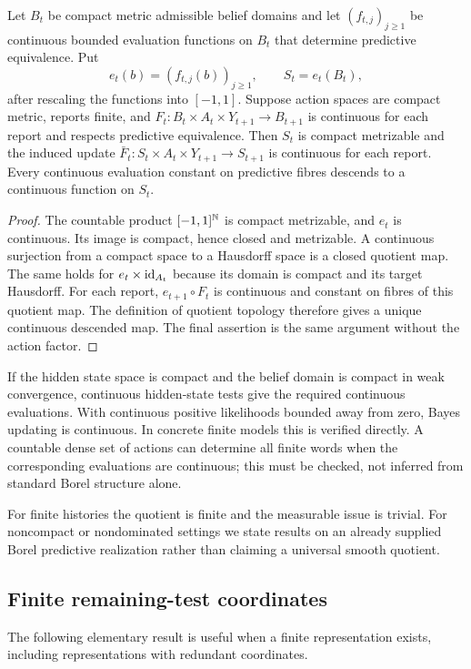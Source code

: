 \begin{theorem}\label{thm:compact-quotient}
Let $B_t$ be compact metric admissible belief domains and let
$(f_{t,j})_{j\ge1}$ be continuous bounded evaluation functions on $B_t$
that determine predictive equivalence. Put
\[
 e_t(b)=(f_{t,j}(b))_{j\ge1},\qquad S_t=e_t(B_t),
\]
after rescaling the functions into $[-1,1]$. Suppose action spaces are compact
metric, reports finite, and $F_t:B_t\times A_t\times Y_{t+1}\to B_{t+1}$
is continuous for each report and respects predictive equivalence. Then
$S_t$ is compact metrizable and the induced update
$\bar F_t:S_t\times A_t\times Y_{t+1}\to S_{t+1}$ is continuous for each
report. Every continuous evaluation constant on predictive fibres descends
to a continuous function on $S_t$.
\end{theorem}
\begin{proof}
The countable product $[-1,1]^{\mathbb N}$ is compact metrizable, and $e_t$ is
continuous. Its image is compact, hence closed and metrizable. A continuous
surjection from a compact space to a Hausdorff space is a closed quotient
map. The same holds for $e_t\times\operatorname{id}_{A_t}$ because its domain is
compact and its target Hausdorff. For each report,
$e_{t+1}\circ F_t$ is continuous and constant on fibres of this quotient
map. The definition of quotient topology therefore gives a unique
continuous descended map. The final assertion is the same argument without
the action factor.
\end{proof}

If the hidden state space is compact and the belief domain is compact in
weak convergence, continuous hidden-state tests give the required
continuous evaluations. With continuous positive likelihoods bounded away
from zero, Bayes updating is continuous. In concrete finite models this is
verified directly. A countable dense set of actions can determine all
finite words when the corresponding evaluations are continuous; this must
be checked, not inferred from standard Borel structure alone.

For finite histories the quotient is finite and the measurable issue is
trivial. For noncompact or nondominated settings we state results on an
already supplied Borel predictive realization rather than claiming a
universal smooth quotient.

\subsection{Finite remaining-test coordinates}
The following elementary result is useful when a finite representation
exists, including representations with redundant coordinates.

